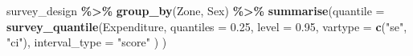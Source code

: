 \documentclass[
  english,
  12pt,
]{book}
\newenvironment{Shaded}{\begin{snugshade}}{\end{snugshade}}
\newcommand{\AttributeTok}[1]{\textcolor[rgb]{0.13,0.29,0.53}{#1}}
\newcommand{\FloatTok}[1]{\textcolor[rgb]{0.00,0.00,0.81}{#1}}
\newcommand{\FunctionTok}[1]{\textcolor[rgb]{0.13,0.29,0.53}{\textbf{#1}}}
\newcommand{\NormalTok}[1]{#1}
\newcommand{\SpecialCharTok}[1]{\textcolor[rgb]{0.81,0.36,0.00}{\textbf{#1}}}
\newcommand{\StringTok}[1]{\textcolor[rgb]{0.31,0.60,0.02}{#1}}
\begin{document}
\begin{Shaded}
\begin{Highlighting}[]
\NormalTok{survey\_design }\SpecialCharTok{\%\textgreater{}\%}
  \FunctionTok{group\_by}\NormalTok{(Zone, Sex) }\SpecialCharTok{\%\textgreater{}\%}
  \FunctionTok{summarise}\NormalTok{(}\AttributeTok{quantile =} \FunctionTok{survey\_quantile}\NormalTok{(Expenditure,}
                                \AttributeTok{quantiles =} \FloatTok{0.25}\NormalTok{,}
                                \AttributeTok{level =} \FloatTok{0.95}\NormalTok{,}
                                \AttributeTok{vartype =} \FunctionTok{c}\NormalTok{(}\StringTok{"se"}\NormalTok{, }\StringTok{"ci"}\NormalTok{),}
                                \AttributeTok{interval\_type =} \StringTok{"score"}
\NormalTok{                                )}
\NormalTok{            )}
\end{Highlighting}
\end{Shaded}
\end{document}

